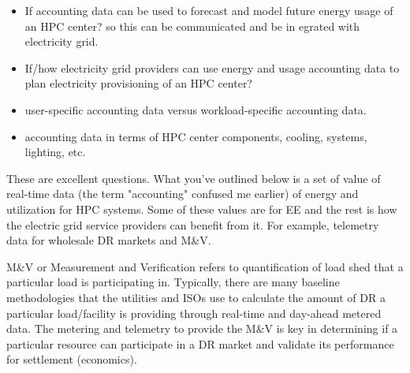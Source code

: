 \begin{itemize}
\item If accounting data can be used to forecast and model future energy usage of an HPC center? so this can be communicated and be in
egrated with electricity grid.
\item If/how electricity grid providers can use energy and usage accounting data to plan electricity provisioning of an HPC center?
\item user-specific accounting data versus workload-specific accounting data.
\item accounting data in terms of HPC center components, cooling, systems, lighting, etc.
\end{itemize}
These are excellent questions. What you've outlined below is a set of value
of real-time data (the term "accounting" confused me earlier) of energy and
utilization for HPC systems. Some of these values are for EE and the rest is
how the electric grid service providers can benefit from it. For example,
telemetry data for wholesale DR markets and M{\&}V.

M{\&}V or Measurement and Verification refers to quantification of load shed
that a particular load is participating in. Typically, there are many
baseline methodologies that the utilities and ISOs use to calculate the
amount of DR a particular load/facility is providing through real-time and
day-ahead metered data. The metering and telemetry to provide the M{\&}V is
key in determining if a particular resource can participate in a DR market 
and validate its performance for settlement (economics).

